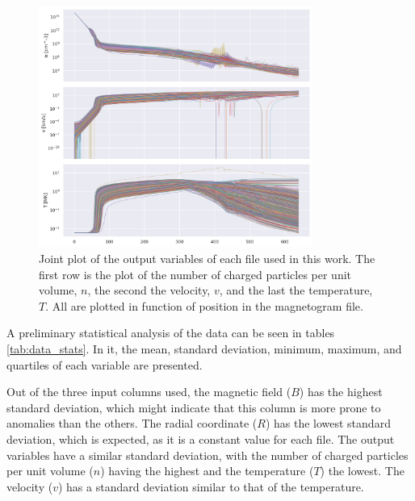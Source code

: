 \begin{figure}[h]
    \centering
    \includegraphics[width=0.8\textwidth]{figures/joint_output_cols.png}
    \caption{Joint plot of the output variables of each file used in this work. The first row is the plot of the number of charged particles per unit volume, $n$, the second the velocity, $v$, and the last the temperature, $T$. All are plotted in function of position in the magnetogram file.}
    \label{fig:jointplot_output}
\end{figure}

A preliminary statistical analysis of the data can be seen in tables \ref{tab:data_stats}. In it, the mean, standard deviation, minimum, maximum, and quartiles of each variable are presented.

Out of the three input columns used, the magnetic field ($B$) has the highest standard deviation, which might indicate that this column is more prone to anomalies than the others. The radial coordinate ($R$) has the lowest standard deviation, which is expected, as it is a constant value for each file. The output variables have a similar standard deviation, with the number of charged particles per unit volume ($n$) having the highest and the temperature ($T$) the lowest. The velocity ($v$) has a standard deviation similar to that of the temperature.

